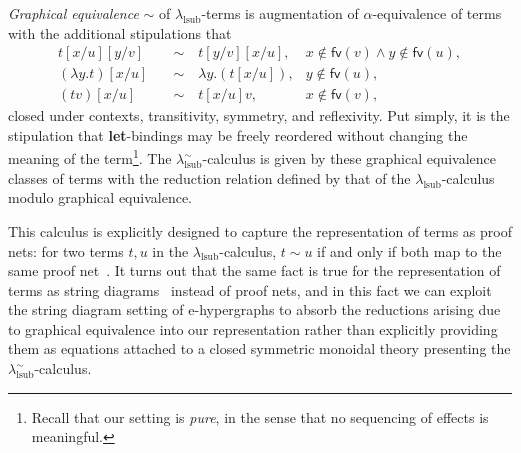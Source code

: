 \emph{Graphical equivalence} $\sim$ of $\lambda_{\text{lsub}}$-terms is augmentation of $\alpha$-equivalence of terms with the additional stipulations that
\begin{align*}
	t [x/u] [y/v] \quad        & \sim \quad t [y/v] [x/u],        & x \notin \textsf{fv} (v) \land y \notin \textsf{fv} (u), \\
	(\lambda y. t) [x/u] \quad & \sim \quad \lambda y. (t [x/u]), & y \notin \textsf{fv} (u),                                \\
	(t v) [x/u] \quad          & \sim \quad t [x/u] v,            & x \notin \textsf{fv} (v),
\end{align*}
closed under contexts, transitivity, symmetry, and reflexivity.
Put simply, it is the stipulation that \textbf{let}-bindings may be freely reordered without changing the meaning of the term\footnote{Recall that our setting is \emph{pure}, in the sense that no sequencing of effects is meaningful.}.
The $\lambda^\sim_{\text{lsub}}$-calculus is given by these graphical equivalence classes of terms with the reduction relation defined by that of the $\lambda_{\text{lsub}}$-calculus modulo graphical equivalence.

This calculus is explicitly designed to capture the representation of terms as proof nets: for two terms $t, u$ in the $\lambda_{\text{lsub}}$-calculus, $t \sim u$ if and only if both map to the same proof net~\cite{?}.
It turns out that the same fact is true for the representation of terms as string diagrams~\cite{ghica2024equivalencehypergraphsegraphsmonoidal} instead of proof nets, and in this fact we can exploit the string diagram setting of e-hypergraphs to absorb the reductions arising due to graphical equivalence into our representation rather than explicitly providing them as equations attached to a closed symmetric monoidal theory presenting the $\lambda^\sim_{\text{lsub}}$-calculus.

